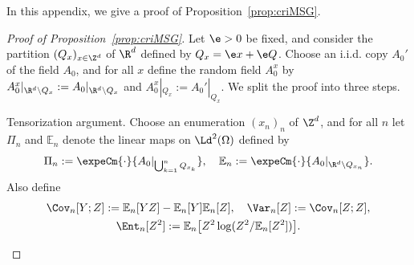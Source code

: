 In this appendix, we give a proof of Proposition~\ref{prop:criMSG}.

\begin{proof}[Proof of Proposition~\ref{prop:criMSG}]
Let $\e>0$ be fixed, and consider the partition $(Q_x)_{x\in\Z^d}$ of $\R^d$ defined by $Q_x=\e x+\e Q$. Choose an i.i.d. copy $A_0'$ of the field $A_0$, and for all $x$ define the random field $A_0^x$ by $A_0^x|_{\R^d\setminus Q_x}:=A_0|_{\R^d\setminus Q_x}$ and $A_0^x|_{Q_x}:=A_0'|_{Q_x}$. We split the proof into three steps.


\setcounter{stepcount}{0}
\begin{step}Tensorization argument.\label{step1proofprop2.3}
Choose an enumeration $(x_n)_n$ of $\Z^d$, and for all $n$ let $\Pi_n$ and $\mathbb E_n$ denote the linear maps on $\Ld^2(\Omega)$ defined by
\[
\Pi_n:=\expeCm{\cdot}{A_0|_{\bigcup_{k=1}^nQ_{x_k}}},\quad\mathbb E_n:=\expeCm{\cdot}{A_0|_{\R^d\setminus Q_{x_n}}}.
\]
Also define
\begin{gather*}
\Cov_{n}[Y;Z]:=\mathbb E_n[YZ]-\mathbb E_n[Y]\mathbb E_n[Z],\quad\Var_{n}[Z]:=\Cov_n[Z;Z],\\
\Ent_n[Z^2]:=\mathbb E_n\big[Z^2\log(Z^2/\mathbb E_n[Z^2])\big].
\end{gather*}
\goodbreak


\end{step}
\end{proof}
